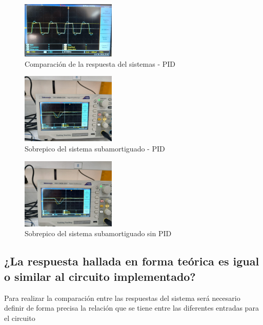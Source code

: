 \documentclass[conference]{IEEEtran}
\begin{document}
	\begin{figure}[h]
		\centering
		\includegraphics[width=0.4\textwidth]{media/sub-respuesta-general.jpeg}
		\caption{Comparación de la respuesta del sistemas - PID}
		\label{fig:sub-respuesta-general}
	\end{figure}
	
	\begin{figure}[h]
		\centering
		\includegraphics[width=0.4\textwidth]{media/sub-sobrepico-104.jpeg}
		\caption{Sobrepico del sistema subamortiguado - PID}
		\label{fig:sub-sobrepico-104}
	\end{figure}
	
	\begin{figure}[h]
		\centering
		\includegraphics[width=0.4\textwidth]{media/sub-sobrepico-116}
		\caption{Sobrepico del sistema subamortiguado sin PID}
		\label{fig:sub-sobrepico-116}
	\end{figure}
		
	\subsection{\textbf{¿La respuesta hallada en forma teórica es igual o similar al circuito implementado?}}
	
	Para realizar la comparación entre las respuestas del sistema será necesario definir de forma precisa la relación que se tiene entre las diferentes entradas para el circuito
	
\end{document}
